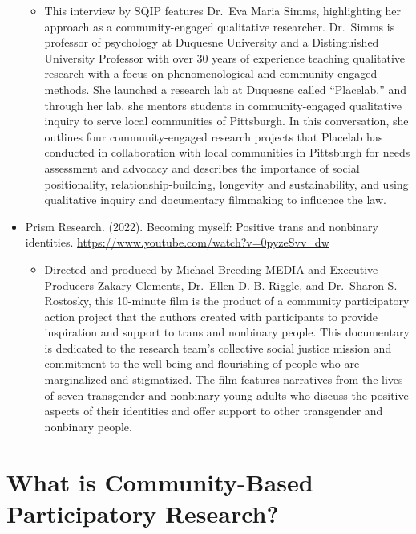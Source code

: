 \documentclass[
  11pt,
]{book}
\providecommand{\tightlist}{%
  \setlength{\itemsep}{0pt}\setlength{\parskip}{0pt}}
\begin{document}
\begin{itemize}
  \begin{itemize}
  \tightlist
  \item
    This interview by SQIP features Dr.~Eva Maria Simms, highlighting her approach as a community-engaged qualitative researcher. Dr.~Simms is professor of psychology at Duquesne University and a Distinguished University Professor with over 30 years of experience teaching qualitative research with a focus on phenomenological and community-engaged methods. She launched a research lab at Duquesne called ``Placelab,'' and through her lab, she mentors students in community-engaged qualitative inquiry to serve local communities of Pittsburgh. In this conversation, she outlines four community-engaged research projects that Placelab has conducted in collaboration with local communities in Pittsburgh for needs assessment and advocacy and describes the importance of social positionality, relationship-building, longevity and sustainability, and using qualitative inquiry and documentary filmmaking to influence the law.
  \end{itemize}
\item
  Prism Research. (2022). Becoming myself: Positive trans and nonbinary identities. \url{https://www.youtube.com/watch?v=0pyzeSvv_dw}

  \begin{itemize}
  \tightlist
  \item
    Directed and produced by Michael Breeding MEDIA and Executive Producers Zakary Clements, Dr.~Ellen D. B. Riggle, and Dr.~Sharon S. Rostosky, this 10-minute film is the product of a community participatory action project that the authors created with participants to provide inspiration and support to trans and nonbinary people. This documentary is dedicated to the research team's collective social justice mission and commitment to the well-being and flourishing of people who are marginalized and stigmatized. The film features narratives from the lives of seven transgender and nonbinary young adults who discuss the positive aspects of their identities and offer support to other transgender and nonbinary people.
  \end{itemize}
\end{itemize}

\section{What is Community-Based Participatory Research?}\label{what-is-community-based-participatory-research}
\end{document}
